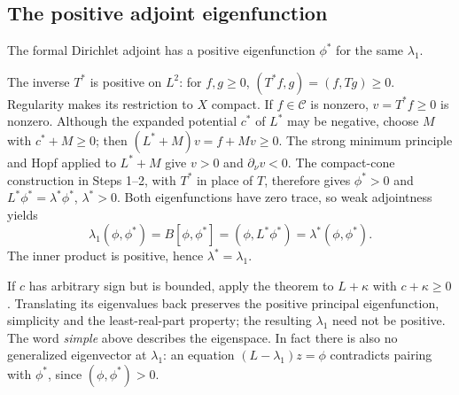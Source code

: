 \Needspace{35mm}
\subsection{The positive adjoint eigenfunction}
\begin{lemma}\label{lem:6-positive-adjoint}
The formal Dirichlet adjoint has a positive eigenfunction $\phi^*$
for the same $\lambda_1$.
\end{lemma}
\begin{expandedproof}
The inverse $T^*$ is positive on $L^2$: for $f,g\geq0$,
$(T^*f,g)=(f,Tg)\geq0$.
Regularity makes its restriction to $X$ compact.
If $f\in\mathcal C$ is nonzero, $v=T^*f\geq0$ is nonzero.
Although the expanded potential $c^*$ of $L^*$ may be negative,
choose $M$ with $c^*+M\geq0$; then
$(L^*+M)v=f+Mv\geq0$.
The strong minimum principle and Hopf applied to $L^*+M$ give
$v>0$ and $\partial_\nu v<0$.
The compact-cone construction in Steps 1--2, with $T^*$ in place of $T$,
therefore gives $\phi^*>0$ and $L^*\phi^*=\lambda^*\phi^*$, $\lambda^*>0$.
Both eigenfunctions have zero trace, so weak adjointness yields
\[
 \lambda_1(\phi,\phi^*)=B[\phi,\phi^*]
 =(\phi,L^*\phi^*)=\lambda^*(\phi,\phi^*).
\]
The inner product is positive, hence $\lambda^*=\lambda_1$.
\end{expandedproof}
\Needspace{45mm}
If $c$ has arbitrary sign but is bounded, apply the theorem to $L+\kappa$
with $c+\kappa\geq0$. Translating its eigenvalues back preserves the positive
principal eigenfunction, simplicity and the least-real-part property;
the resulting $\lambda_1$ need not be positive.
The word \emph{simple} above describes the eigenspace. In fact there is
also no generalized eigenvector at $\lambda_1$: an equation
$(L-\lambda_1)z=\phi$ contradicts pairing with $\phi^*$, since
$(\phi,\phi^*)>0$.
